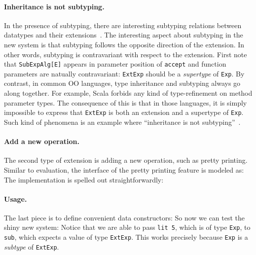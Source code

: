 \paragraph{Inheritance is not subtyping.} In the presence of subtyping, there
are interesting subtyping relations between datatypes and their
extensions~\cite{oliveira09modular}. The interesting aspect about subtyping in
the new system is that subtyping follows the opposite direction of the
extension. In other words, subtyping is contravariant with respect to the
extension. First note that \lstinline{SubExpAlg[E]} appears in parameter
position of \lstinline{accept} and function parameters are natually
contravariant: \lstinline{ExtExp} should be a \textit{supertype} of
\lstinline{Exp}. By contrast, in common OO languages, type inheritance and
subtyping always go along together. For example, Scala forbids any kind of
type-refinement on method parameter types. The consequence of this is that in
those languages, it is simply impossible to express that \lstinline{ExtExp} is
both an extension and a supertype of \lstinline{Exp}. Such kind of phenomena is
an example where ``inheritance is not subtyping''~\cite{cook1989inheritance}.

\paragraph{Add a new operation.} The second type of extension is adding a new
operation, such as pretty printing. Similar to evaluation, the interface of the
pretty printing feature is modeled as:
The implementation is spelled out straightforwardly:


\paragraph{Usage.} The last piece is to define convenient data constructors:
So now we can test the shiny new system:
Notice that we are able to pass \lstinline{lit 5}, which is of type
\lstinline{Exp}, to \lstinline{sub}, which expects a value of type
\lstinline{ExtExp}. This works precisely because \lstinline{Exp} is a
\textit{subtype} of \lstinline{ExtExp}.



